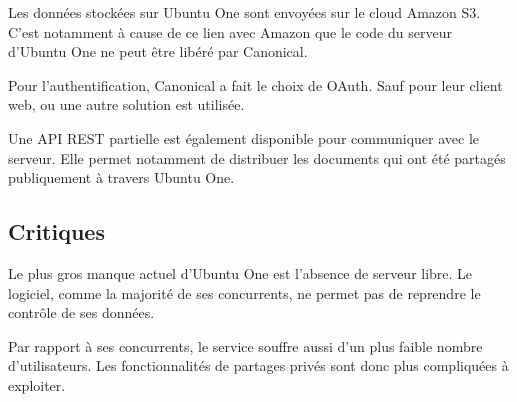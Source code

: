 Les données stockées sur Ubuntu One sont envoyées sur le cloud Amazon S3. C'est notamment à cause de ce lien avec Amazon que le code du serveur d'Ubuntu One ne peut être libéré par Canonical.

Pour l'authentification, Canonical a fait le choix de OAuth. Sauf pour leur client web, ou une autre solution est utilisée.

Une API REST partielle est également disponible pour communiquer avec le serveur. Elle permet notamment de distribuer les documents qui ont été partagés publiquement à travers Ubuntu One.

\subsection{Critiques}
Le plus gros manque actuel d'Ubuntu One est l'absence de serveur libre. Le logiciel, comme la majorité de ses concurrents, ne permet pas de reprendre le contrôle de ses données.

Par rapport à ses concurrents, le service souffre aussi d'un plus faible nombre d'utilisateurs. Les fonctionnalités de partages privés sont donc plus compliquées à exploiter.
